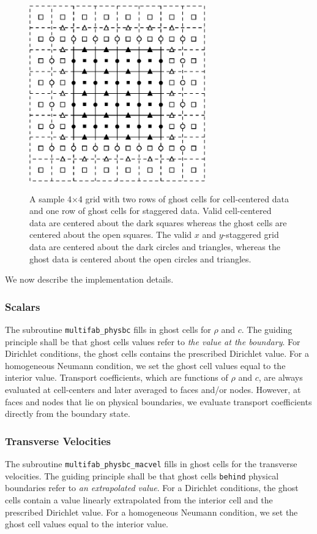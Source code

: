 \documentclass[final]{siamltex}
\begin{document}
\begin{figure}[tb]
\centering
\includegraphics[width=3in]{ghost}
\label{fig:ghost}
\caption{A sample 4$\times$4 grid with two rows of ghost cells for cell-centered data and one row of
ghost cells for staggered data.  Valid cell-centered data are centered about the dark squares whereas the 
ghost cells are centered about the open squares.  The valid $x$ and $y$-staggered grid data are centered 
about the dark circles and triangles, whereas the ghost data is centered about the open circles and triangles.}
\end{figure}
We now describe the implementation details.

\subsubsection{Scalars}
The subroutine {\tt multifab\_physbc} fills in ghost cells for $\rho$ and $c$.
The guiding principle shall be that ghost cells values refer to {\it the value at the boundary}.
For Dirichlet conditions, the ghost cells contains the prescribed Dirichlet value.
For a homogeneous Neumann condition, we set the ghost cell values equal to the interior value.
Transport coefficients, which are functions of $\rho$ and $c$, are always evaluated at cell-centers 
and later averaged to faces and/or nodes.  However, at faces and nodes that lie on physical 
boundaries, we evaluate transport coefficients directly from the boundary state.

\subsubsection{Transverse Velocities}
The subroutine {\tt multifab\_physbc\_macvel} fills in ghost cells for the transverse velocities.
The guiding principle shall be that ghost cells {\tt behind} physical boundaries refer to 
{\it an extrapolated value}.  For a Dirichlet conditions, the ghost cells contain a value linearly
extrapolated from the interior cell and the prescribed Dirichlet value.
For a homogeneous Neumann condition, we set the ghost cell values equal to the interior value.  
\end{document}
